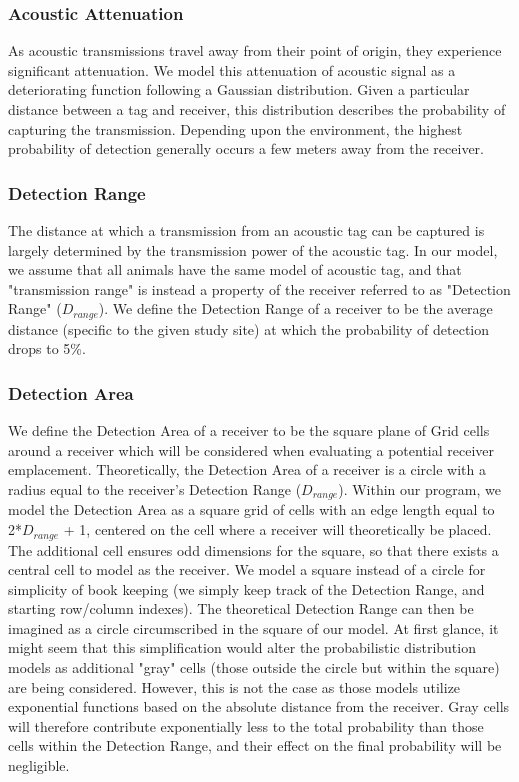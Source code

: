 \subsubsection{Acoustic Attenuation}
\label{acousticAttenuation}
As acoustic transmissions travel away from their point of origin, they experience significant attenuation.  We model this attenuation of acoustic signal as a deteriorating function following a Gaussian distribution.  Given a particular distance between a tag and receiver, this distribution describes the probability of capturing the transmission.  Depending upon the environment, the highest probability of detection generally occurs a few meters away from the receiver.

\subsubsection{Detection Range}
\label{detectionRange}
The distance at which a transmission from an acoustic tag can be captured is largely determined by the transmission power of the acoustic tag.  In our model, we assume that all animals have the same model of acoustic tag, and that "transmission range" is instead a property of the receiver referred to as "Detection Range" ($D_{range}$).  We define the Detection Range of a receiver to be the average distance (specific to the given study site) at which the probability of detection drops to 5\%.

\subsubsection{Detection Area}
\label{detectionArea}
We define the Detection Area of a receiver to be the square plane of Grid cells around a receiver which will be considered when evaluating a potential receiver emplacement.  Theoretically, the Detection Area of a receiver is a circle with a radius equal to the receiver's Detection Range ($D_{range}$).  Within our program, we model the Detection Area as a square grid of cells with an edge length equal to 2*$D_{range}$ + 1, centered on the cell where a receiver will theoretically be placed.  The additional cell ensures odd dimensions for the square, so that there exists a central cell to model as the receiver.  We model a square instead of a circle for simplicity of book keeping (we simply keep track of the Detection Range, and starting row/column indexes).  The theoretical Detection Range can then be imagined as a circle circumscribed in the square of our model.  At first glance, it might seem that this simplification would alter the probabilistic distribution models as additional "gray" cells (those outside the circle but within the square) are being considered.  However, this is not the case as those models utilize exponential functions based on the absolute distance from the receiver.  Gray cells will therefore contribute exponentially less to the total probability than those cells within the Detection Range, and their effect on the final probability will be negligible.  

